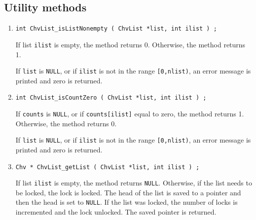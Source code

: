 \subsection{Utility methods}
\label{subsection:ChvList:proto:utility}
\par
\begin{enumerate}
\item
\begin{verbatim}
int ChvList_isListNonempty ( ChvList *list, int ilist ) ;
\end{verbatim}
\par
If list {\tt ilist} is empty, the method returns 0.
Otherwise, the method returns 1.
\par {}
If {\tt list} is {\tt NULL},
or if {\tt ilist} is not in the range {\tt [0,nlist)},
an error message is printed and zero is returned.
\item
\begin{verbatim}
int ChvList_isCountZero ( ChvList *list, int ilist ) ;
\end{verbatim}
\par
If {\tt counts} is {\tt NULL}, 
or if {\tt counts[ilist]} equal to zero, the method returns 1.
Otherwise, the method returns 0.
\par {}
If {\tt list} is {\tt NULL},
or if {\tt ilist} is not in the range {\tt [0,nlist)},
an error message is printed and zero is returned.
\item
\begin{verbatim}
Chv * ChvList_getList ( ChvList *list, int ilist ) ;
\end{verbatim}
\par
If list {\tt ilist} is empty, the method returns {\tt NULL}.
Otherwise, if the list needs to be locked, the lock is locked.
The head of the list is saved to a pointer and then the head is set
to {\tt NULL}.
If the list was locked, the number of locks is incremented and the
lock unlocked.
The saved pointer is returned.
\par {}

\end{enumerate}
